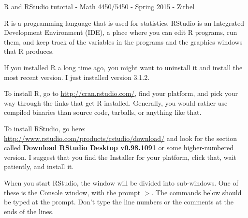 
\usepackage{hyperref}              %



\renewcommand{\baselinestretch}{1.1}

\begin{center} {\sc
R and RStudio tutorial - Math 4450/5450 - Spring 2015 - Zirbel}\\
\end{center}

\renewcommand{\blist}[1]{\begin{list}{{\arabic{enumi}:}}{\usecounter{enumi}\setlength{\itemsep}{#1}}}
\renewcommand{\elist}{\end{list}}

R is a programming language that is used for statistics.
RStudio is an Integrated Development Environment (IDE), a place where you can edit R programs, run them, and keep track of the variables in the programs and the graphics windows that R produces.


If you installed R a long time ago, you might want to uninstall it and install the most recent version.  I just installed version 3.1.2.

To install R, go to \url{http://cran.rstudio.com/}, find your platform, and pick your way through the links that get R installed.  Generally, you would rather use compiled binaries than source code, tarballs, or anything like that.

To install RStudio, go here:  \url{http://www.rstudio.com/products/rstudio/download/} and look for the section called {\bf Download RStudio Desktop v0.98.1091} or some higher-numbered version.
I suggest that you find the Installer for your platform, click that, wait patiently, and install it.

When you start RStudio, the window will be divided into sub-windows.
One of these is the Console window, with the prompt $>$.
The commands below should be typed at the prompt.
Don't type the line numbers or the comments at the ends of the lines.

